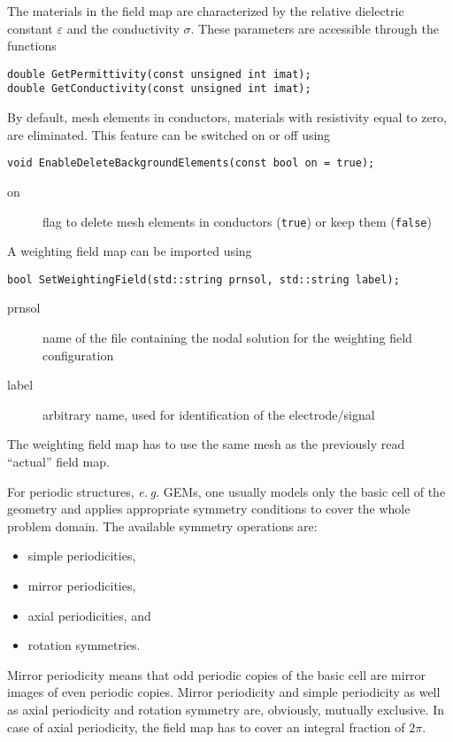 The materials in the field map are characterized by the 
relative dielectric constant \(\varepsilon\) and the 
conductivity \(\sigma\). 
These parameters are accessible through the functions
\begin{lstlisting}
double GetPermittivity(const unsigned int imat);
double GetConductivity(const unsigned int imat);
\end{lstlisting}

By default, mesh elements in conductors, \ie materials 
with resistivity equal to zero, are eliminated. This feature can be 
switched on or off using
\begin{lstlisting}
void EnableDeleteBackgroundElements(const bool on = true);
\end{lstlisting}
\begin{description}
  \item[on] flag to delete mesh elements in conductors (\texttt{true}) or keep them (\texttt{false}) 
\end{description}
A weighting field map can be imported using
\begin{lstlisting}
bool SetWeightingField(std::string prnsol, std::string label);
\end{lstlisting}
\begin{description}
  \item[prnsol]
  name of the file containing the nodal solution for the weighting field
  configuration
  \item[label]
  arbitrary name, used for identification of the electrode/signal
\end{description}

The weighting field map has to use the same mesh as the previously 
read ``actual'' field map.

For periodic structures, \textit{e.\,g.} GEMs, one usually models only 
the basic cell of the geometry and applies appropriate symmetry 
conditions to cover the whole problem domain. 
The available symmetry operations are:
\begin{itemize}
  \item
  simple periodicities,
  \item
  mirror periodicities, 
  \item
  axial periodicities, and
  \item
  rotation symmetries.
\end{itemize}

Mirror periodicity means that odd periodic copies of the basic cell 
are mirror images of even periodic copies.
Mirror periodicity and simple periodicity as well as 
axial periodicity and rotation symmetry are, 
obviously, mutually exclusive. 
In case of axial periodicity, the field map has to cover an 
integral fraction of \(2\pi\). 

